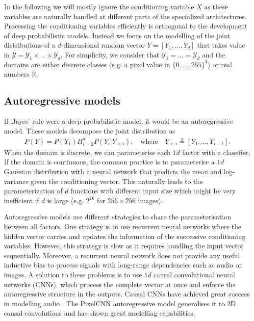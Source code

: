In the following we will mostly ignore the conditioning variable $X$ as these variables are naturally handled at different parts of the specialized architectures. Processing the conditioning variables efficiently is orthogonal to the development of deep probabilistic models. Instead we focus on the modelling of the joint distributions of a $d$-dimensional random vector $Y = \left[Y_1, \dots, Y_d  \right]$ that takes value in $\mathcal{Y} = \mathcal{Y}_1 \times \dots \times \mathcal{Y}_d$. For simplicity, we consider that $\mathcal{Y}_1 = \dots = \mathcal{Y}_d$ and the domains are either discrete classes (e.g. a pixel value in $\{0, \dots, 255\}^3$) or real numbers $\mathbb{R}$.
\subsection{Autoregressive models} \label{subsec:AM}
If Bayes' rule were a deep probabilistic model, it would be an autoregressive model. These models decompose the joint distribution as
\begin{align}
  P(Y) = P(Y_1) \Pi^d_{i=2} P(Y_i|Y_{<i}), \quad \text{where} \quad Y_{<i} \triangleq \left[ Y_1, \dots, Y_{i-1}\right].
\end{align}
When the domain is discrete, we can parameterise each $1d$ factor with a classifier. If the domain is continuous, the common practice is to parameterise a $1d$ Gaussian distribution with a neural network that predicts the mean and log-variance given the conditioning vector.
This naturally leads to the parameterization of $d$ functions with different input size which might be very inefficient if $d$ is large (e.g. $2^16$ for $256\times256$ images).

Autoregressive models use different strategies to share the parameterisation between all factors. One strategy is to use recurrent neural networks where the hidden vector carries and updates the information of the successive conditioning variables\citep{van2016pixel}. However, this strategy is slow as it requires handling the input vector sequentially. Moreover, a recurrent neural network does not provide any useful inductive bias to process signals with long-range dependencies such as audio or images. A solution to these problems is to use $1d$ causal convolutional neural networks (CNNs), which process the complete vector at once and enforce the autoregressive structure in the outputs. Causal CNNs have achieved great success in modelling audio \citep{van_den_oord_wavenet_2016, van_den_oord_parallel_2018}. The PixelCNN autoregressive model generalises it to 2D causal convolutions and has shown great modelling capabilities\citep{oord_conditional_2016}.

